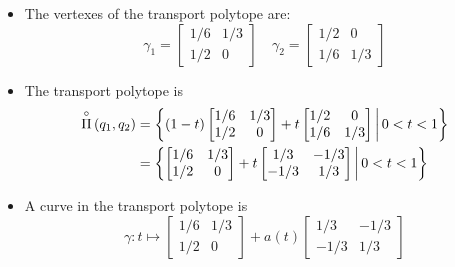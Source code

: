 \documentclass[xcolor=svgnames]{beamer}
\newcommand{\openplan}[2]{\overset{\circ}\Pi\left(#1,#2\right)}
\begin{document}
\begin{frame}
\begin{itemize}
\item The vertexes of the transport polytope are:
\begin{equation*}
\gamma_1 = \begin{bmatrix} 1/6 & 1/3 \\ 1/2 & 0 \end{bmatrix} \quad 
\gamma_2 = \begin{bmatrix} 1/2 & 0 \\ 1/6 & 1/3 \end{bmatrix}\end{equation*}
\item The transport polytope is 
\begin{align*}
 \openplan{q_1}{q_2} &= \setof{(1-t)\begin{bmatrix} 1/6 & 1/3 \\ 1/2 & 0 \end{bmatrix} + t \begin{bmatrix} 1/2 & 0 \\ 1/6 & 1/3 \end{bmatrix}}{0 < t < 1} \\
 &= \setof{\begin{bmatrix} 1/6 & 1/3 \\ 1/2 & 0 \end{bmatrix} + t \begin{bmatrix} 1/3 & -1/3 \\ -1/3 & 1/3 \end{bmatrix}}{0 < t < 1}
\end{align*}
\item A curve in the transport polytope is 
\begin{equation*}
   \gamma \colon t \mapsto \begin{bmatrix} 1/6 & 1/3 \\ 1/2 & 0 \end{bmatrix} + a(t) \begin{bmatrix} 1/3 & -1/3 \\ -1/3 & 1/3 \end{bmatrix}
\end{equation*}

\end{itemize}
\end{frame}
\end{document}
